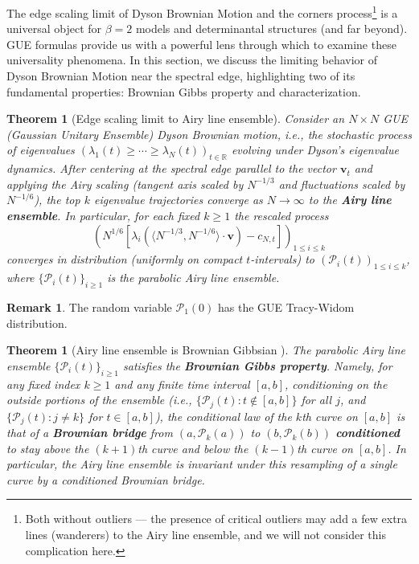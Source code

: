 \documentclass[letterpaper,11pt,oneside,reqno]{book}
\numberwithin{equation}{chapter}  %
\newtheorem{theorem}[proposition]{Theorem}
\theoremstyle{definition}
\newtheorem{remark}[proposition]{Remark}
\begin{document}
The edge scaling limit of Dyson Brownian Motion
and the corners process\footnote{Both without outliers --- the presence of
critical outliers may add a few extra lines (wanderers) to the Airy line ensemble,
and we will not consider this complication here.}
is a universal object for $\beta=2$ models and determinantal structures (and far beyond).
GUE formulas
provide us with a powerful lens through which to examine these universality phenomena. In this section, we discuss the limiting behavior of Dyson Brownian Motion near the spectral edge, highlighting two of its fundamental properties: Brownian Gibbs property and characterization.

\begin{theorem}[Edge scaling limit to Airy line ensemble]
	Consider an $N\times N$ GUE (Gaussian Unitary Ensemble) Dyson Brownian motion, i.e., the stochastic process of eigenvalues $(\lambda_1(t)\ge \cdots\ge \lambda_N(t))_{t\in\mathbb{R}}$ evolving under Dyson's eigenvalue dynamics. After centering at the spectral edge parallel to the vector $\mathbf{v}_t$ and applying the
Airy scaling (tangent axis scaled by $N^{-1/3}$ and fluctuations scaled by $N^{-1/6}$), the top $k$ eigenvalue trajectories converge as $N\to\infty$ to the \textbf{Airy line ensemble}. In particular, for each fixed $k\ge1$ the rescaled process $$(N^{1/6}[\lambda_i(\langle
			N^{-1/3},N^{-1/6}
\rangle \cdot \mathbf{v})-c_{N,t}])_{1\le i\le k}$$ converges in distribution (uniformly on compact $t$-intervals) to $(\mathcal{P}_i(t))_{1\le i\le k}$, where $\{\mathcal{P}_i(t)\}_{i\ge1}$ is the parabolic Airy line ensemble.
\end{theorem}

\begin{remark}
	The random variable $\mathcal{P}_1(0)$ has the GUE Tracy-Widom distribution.
\end{remark}

\begin{theorem}[Airy line ensemble is Brownian Gibbsian \cite{CorwinHammond2013}]
The parabolic Airy line ensemble
$\{\mathcal{P}_i(t)\}_{i\ge1}$ satisfies the
\textbf{Brownian Gibbs property}. Namely, for any fixed
index $k\ge1$ and any finite time interval $[a,b]$,
conditioning on the outside portions of the ensemble (i.e.,
$\{\mathcal{P}_j(t): t\notin[a,b]\}$ for all $j$, and
$\{\mathcal{P}_j(t): j\neq k\}$ for $t\in[a,b]$), the
conditional law of the $k$th curve on $[a,b]$ is that of a
\textbf{Brownian bridge} from $(a,\mathcal{P}_k(a))$ to
$(b,\mathcal{P}_k(b))$ \textbf{conditioned} to stay above
the $(k+1)$th curve and below the $(k-1)$th curve on
$[a,b]$. In particular, the Airy line ensemble is invariant
under this resampling of a single curve by a conditioned
Brownian bridge.
\end{theorem}
\end{document}
